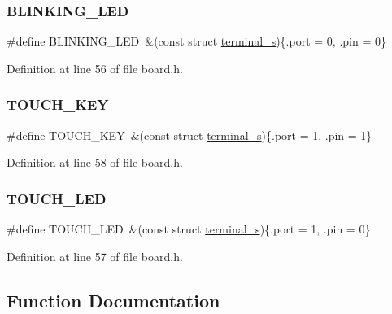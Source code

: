 \subsubsection{\texorpdfstring{B\+L\+I\+N\+K\+I\+N\+G\+\_\+\+L\+ED}{BLINKING\_LED}}
{\footnotesize\ttfamily \#define B\+L\+I\+N\+K\+I\+N\+G\+\_\+\+L\+ED~\&(const struct \hyperlink{structterminal__s}{terminal\+\_\+s})\{.port = 0, .pin = 0\}}



Definition at line 56 of file board.\+h.

\mbox{\label{group__boards_ga622f361da595a38bbb742894f48f7339}} 
\subsubsection{\texorpdfstring{T\+O\+U\+C\+H\+\_\+\+K\+EY}{TOUCH\_KEY}}
{\footnotesize\ttfamily \#define T\+O\+U\+C\+H\+\_\+\+K\+EY~\&(const struct \hyperlink{structterminal__s}{terminal\+\_\+s})\{.port = 1, .pin = 1\}}



Definition at line 58 of file board.\+h.

\mbox{\label{group__boards_ga11baf524276151957e8037eaed95b162}} 
\subsubsection{\texorpdfstring{T\+O\+U\+C\+H\+\_\+\+L\+ED}{TOUCH\_LED}}
{\footnotesize\ttfamily \#define T\+O\+U\+C\+H\+\_\+\+L\+ED~\&(const struct \hyperlink{structterminal__s}{terminal\+\_\+s})\{.port = 1, .pin = 0\}}



Definition at line 57 of file board.\+h.



\subsection{Function Documentation}
\mbox{\label{group__boards_gad24575a3bcf2c2433e7720830d813e64}} 
